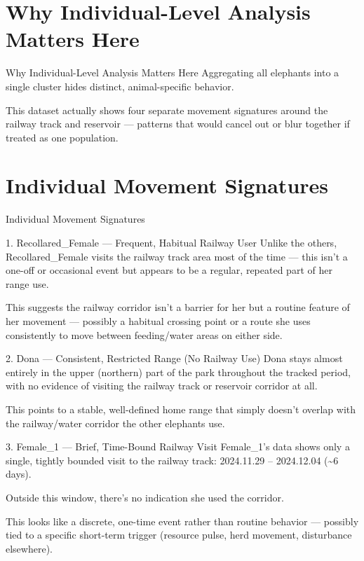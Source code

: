 \documentclass{beamer}
\begin{document}
	
	
	
	
	
	\section{Why Individual-Level Analysis Matters Here }
	\begin{frame}{Why Individual-Level Analysis Matters Here}
		\Large
		Aggregating all elephants into a single cluster hides distinct, animal-specific behavior.
		
		This dataset actually shows four separate movement signatures around the railway track and reservoir --- patterns that would cancel out or blur together if treated as one population.
	\end{frame}
	
	
	
	\section{Individual Movement Signatures}
	\begin{frame}{Individual Movement Signatures}
		\begin{block}{1. Recollared\_Female --- Frequent, Habitual Railway User}
			Unlike the others, Recollared\_Female visits the railway track area most of the time --- this isn't a one-off or occasional event but appears to be a regular, repeated part of her range use.
			
			This suggests the railway corridor isn't a barrier for her but a routine feature of her movement --- possibly a habitual crossing point or a route she uses consistently to move between feeding/water areas on either side.
		\end{block}
		
		
		\begin{block}{2. Dona --- Consistent, Restricted Range (No Railway Use)}
			Dona stays almost entirely in the upper (northern) part of the park throughout the tracked period, with no evidence of visiting the railway track or reservoir corridor at all.
			
			This points to a stable, well-defined home range that simply doesn't overlap with the railway/water corridor the other elephants use.
		\end{block}
	\end{frame}
	
	\begin{frame}
		\begin{block}{3. Female\_1 --- Brief, Time-Bound Railway Visit}
			Female\_1's data shows only a single, tightly bounded visit to the railway track: 2024.11.29 -- 2024.12.04 (\textasciitilde 6 days).
			
			Outside this window, there's no indication she used the corridor.
			
			This looks like a discrete, one-time event rather than routine behavior --- possibly tied to a specific short-term trigger (resource pulse, herd movement, disturbance elsewhere).
		\end{block}
	\end{frame}
	
\end{document}
